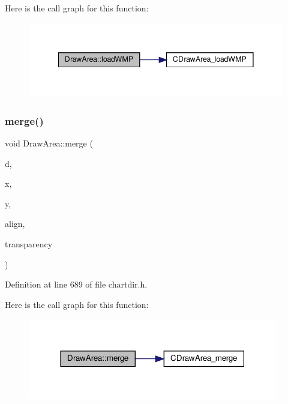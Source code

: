 Here is the call graph for this function\+:
\nopagebreak
\begin{figure}[H]
\begin{center}
\leavevmode
\includegraphics[width=341pt]{class_draw_area_a4681d7c6e3a8f24252cecc0882da7c24_cgraph}
\end{center}
\end{figure}
\mbox{\label{class_draw_area_a97253516094836632b2df9204dcc1155}} 
\subsubsection{\texorpdfstring{merge()}{merge()}}
{\footnotesize\ttfamily void Draw\+Area\+::merge (\begin{DoxyParamCaption}\item[{const \hyperlink{class_draw_area}{Draw\+Area} $\ast$}]{d,  }\item[{int}]{x,  }\item[{int}]{y,  }\item[{int}]{align,  }\item[{int}]{transparency }\end{DoxyParamCaption})\hspace{0.3cm}{\ttfamily [inline]}}



Definition at line 689 of file chartdir.\+h.

Here is the call graph for this function\+:
\nopagebreak
\begin{figure}[H]
\begin{center}
\leavevmode
\includegraphics[width=309pt]{class_draw_area_a97253516094836632b2df9204dcc1155_cgraph}
\end{center}
\end{figure}
\mbox{\label{class_draw_area_ac6004a74de78eb60bf5ce415070cce6f}} 
